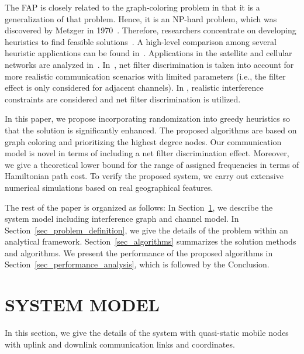 \documentclass[10pt,twocolumn,twoside]{JCNtran}
\begin{document}
The FAP is closely related to the graph-coloring problem in that it is a generalization of that problem. Hence, it is an NP-hard problem, which was discovered by Metzger in 1970~\cite{metzger1970spectrumMT,hale1980frequencyAT}. Therefore, researchers concentrate on developing heuristics to find feasible solutions~\cite{montemanni2010heuristicMT,fischetti2000frequencyAI,maniezzo2000antsHF}. A high-level comparison among several heuristic applications can be found in~\cite{aardal2007modelsAS,hurley1996comparisonOL,lozano2012interferencePA,sharma2014compositeDE,koo2016heuristicsFF}. Applications in the satellite and cellular networks are analyzed in~\cite{graham2008frequencyAM,hurley2000channelAI,wang2015multiobjectiveEA,audhya2013newAT,da2013newMA,qian2015adaptiveSF}.  In~\cite{mannino2003enumerativeAF}, net filter discrimination is taken into account for more realistic communication scenarios with  limited parameters (i.e., the filter effect is only considered for adjacent channels). In \cite{koo2016heuristicsFF}, realistic interference constraints are considered and net filter discrimination is utilized.

In this paper, we propose incorporating randomization into greedy heuristics so that the solution is significantly enhanced. The proposed algorithms are based on graph coloring and prioritizing the highest degree nodes. Our communication model is novel in terms of including a net filter discrimination effect. Moreover, we give a theoretical lower bound for the range of assigned frequencies in terms of Hamiltonian path cost. To verify the proposed system, we carry out extensive numerical simulations based on real geographical features.

The rest of the paper is organized as follows: In Section~\ref{sec_system_model}, we describe the system model including interference graph and channel model. In Section~\ref{sec_problem_definition}, we give the details of the problem within an analytical framework. Section~\ref{sec_algorithms} summarizes the solution methods and algorithms. We present the performance of the proposed algorithms in Section~\ref{sec_performance_analysis}, which is followed by the Conclusion.





\section{\uppercase{System Model}}
\label{sec_system_model}
In this section, we give the details of the system with  quasi-static mobile nodes with uplink and downlink communication links and coordinates. 
\end{document}
